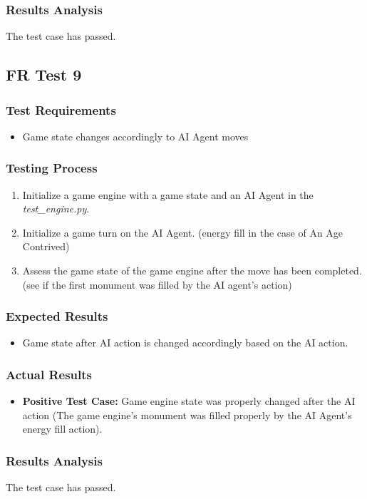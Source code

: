 \documentclass[12pt, titlepage]{article}
\begin{document}
\subsubsection{Results Analysis}
The test case has passed.

\subsection{FR Test 9}
\subsubsection{Test Requirements}
\begin{itemize}
    \item Game state changes accordingly to AI Agent moves
\end{itemize}
\subsubsection{Testing Process}
\begin{enumerate}
    \item Initialize a game engine with a game state and an AI Agent in the \textit{test\_engine.py}. 
    \item Initialize a game turn on the AI Agent. (energy fill in the case of An Age Contrived)
    \item Assess the game state of the game engine after the move has been completed. (see if the first monument was filled by the AI agent's action)
\end{enumerate}
\subsubsection{Expected Results}
\begin{itemize}
    \item Game state after AI action is changed accordingly based on the AI action.
\end{itemize}
\subsubsection{Actual Results}
\begin{itemize}
    \item \textbf{Positive Test Case:} Game engine state was properly changed after the AI action (The game engine's monument was filled properly by the AI Agent's energy fill action).
\end{itemize}
\subsubsection{Results Analysis}
The test case has passed.
\end{document}

